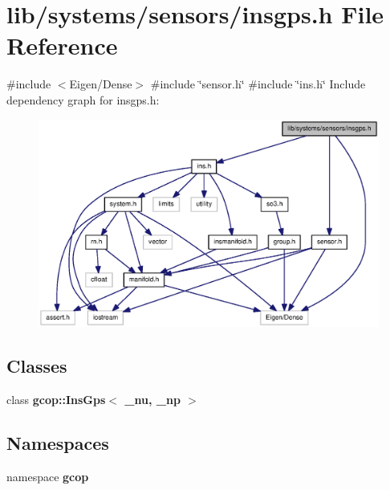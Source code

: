 \section{lib/systems/sensors/insgps.h \-File \-Reference}
\label{insgps_8h}
{\ttfamily \#include $<$\-Eigen/\-Dense$>$}\*
{\ttfamily \#include \char`\"{}sensor.\-h\char`\"{}}\*
{\ttfamily \#include \char`\"{}ins.\-h\char`\"{}}\*
\-Include dependency graph for insgps.\-h\-:
\nopagebreak
\begin{figure}[H]
\begin{center}
\leavevmode
\includegraphics[width=350pt]{insgps_8h__incl}
\end{center}
\end{figure}
\subsection*{\-Classes}
\begin{DoxyCompactItemize}
\item 
class {\bf gcop\-::\-Ins\-Gps$<$ \-\_\-nu, \-\_\-np $>$}
\end{DoxyCompactItemize}
\subsection*{\-Namespaces}
\begin{DoxyCompactItemize}
\item 
namespace {\bf gcop}
\end{DoxyCompactItemize}
